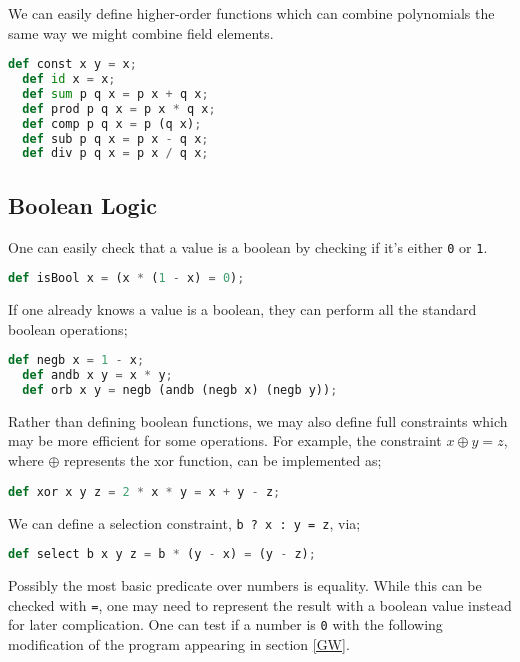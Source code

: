 We can easily define higher-order functions which can combine polynomials the same way we might combine field elements.

\begin{lstlisting}[language=Python]
  def const x y = x;
  def id x = x;
  def sum p q x = p x + q x;
  def prod p q x = p x * q x;
  def comp p q x = p (q x);
  def sub p q x = p x - q x;
  def div p q x = p x / q x;
\end{lstlisting}

\subsection{Boolean Logic}

One can easily check that a value is a boolean by checking if it's either \lstinline{0} or \lstinline{1}.

\begin{lstlisting}[language=Python]
  def isBool x = (x * (1 - x) = 0);
\end{lstlisting}

If one already knows a value is a boolean, they can perform all the standard boolean operations;

\begin{lstlisting}[language=Python]
  def negb x = 1 - x;
  def andb x y = x * y;
  def orb x y = negb (andb (negb x) (negb y));
\end{lstlisting}

Rather than defining boolean functions, we may also define full constraints which may be more efficient for some operations. For example, the constraint $x \oplus y = z$, where $\oplus$ represents the xor function, can be implemented as;

\begin{lstlisting}[language=Python]
  def xor x y z = 2 * x * y = x + y - z;
\end{lstlisting}

We can define a selection constraint, \lstinline{b ? x : y = z}, via;

\begin{lstlisting}[language=Python]
  def select b x y z = b * (y - x) = (y - z);
\end{lstlisting}

Possibly the most basic predicate over numbers is equality. While this can be checked with \lstinline{=}, one may need to represent the result with a boolean value instead for later complication. One can test if a number is \lstinline{0} with the following modification of the program appearing in section \ref{GW}.

